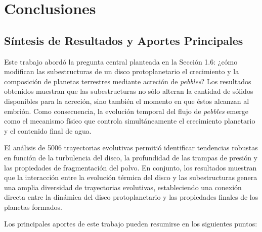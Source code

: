 
\chapter{Conclusiones}
\label{cap:conclusiones}

\section{Síntesis de Resultados y Aportes Principales}

Este trabajo abordó la pregunta central planteada en la Sección 1.6: ¿cómo modifican las subestructuras de un disco protoplanetario el crecimiento y la composición de planetas terrestres mediante acreción de \textit{pebbles}? Los resultados obtenidos muestran que las subestructuras no sólo alteran la cantidad de sólidos disponibles para la acreción, sino también el momento en que éstos alcanzan al embrión. Como consecuencia, la evolución temporal del flujo de \textit{pebbles} emerge como el mecanismo físico que controla simultáneamente el crecimiento planetario y el contenido final de agua.

El análisis de 5006 trayectorias evolutivas permitió identificar tendencias robustas en función de la turbulencia del disco, la profundidad de las trampas de presión y las propiedades de fragmentación del polvo. En conjunto, los resultados muestran que la interacción entre la evolución térmica del disco y las subestructuras genera una amplia diversidad de trayectorias evolutivas, estableciendo una conexión directa entre la dinámica del disco protoplanetario y las propiedades finales de los planetas formados.

Los principales aportes de este trabajo pueden resumirse en los siguientes puntos:

